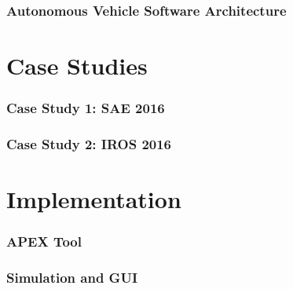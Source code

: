 \documentclass[11pt]{article}              %
\begin{document}
\section{Autonomous Vehicle Software Architecture}

\part{Case Studies}
\section{Case Study 1: SAE 2016}

\section{Case Study 2: IROS 2016}

\part{Implementation}
\section{APEX Tool}

\section{Simulation and GUI}




 
\end{document}
